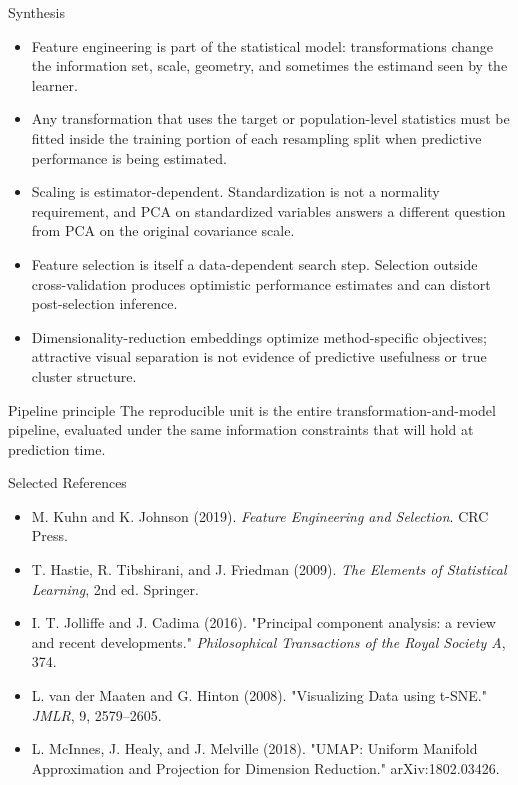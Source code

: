 \documentclass[aspectratio=169,11pt]{beamer}
\begin{document}
\begin{frame}{Synthesis}
  \begin{itemize}
    \item Feature engineering is part of the statistical model: transformations change the information set, scale, geometry, and sometimes the estimand seen by the learner.
    \item Any transformation that uses the target or population-level statistics must be fitted inside the training portion of each resampling split when predictive performance is being estimated.
    \item Scaling is estimator-dependent. Standardization is not a normality requirement, and PCA on standardized variables answers a different question from PCA on the original covariance scale.
    \item Feature selection is itself a data-dependent search step. Selection outside cross-validation produces optimistic performance estimates and can distort post-selection inference.
    \item Dimensionality-reduction embeddings optimize method-specific objectives; attractive visual separation is not evidence of predictive usefulness or true cluster structure.
  \end{itemize}

  \begin{alertbox}{Pipeline principle}
    The reproducible unit is the entire transformation-and-model pipeline, evaluated under the same information constraints that will hold at prediction time.
  \end{alertbox}
\end{frame}

\begin{frame}{Selected References}
  \small
  \begin{itemize}
    \item M. Kuhn and K. Johnson (2019). \textit{Feature Engineering and Selection}. CRC Press.
    \item T. Hastie, R. Tibshirani, and J. Friedman (2009). \textit{The Elements of Statistical Learning}, 2nd ed. Springer.
    \item I. T. Jolliffe and J. Cadima (2016). "Principal component analysis: a review and recent developments." \textit{Philosophical Transactions of the Royal Society A}, 374.
    \item L. van der Maaten and G. Hinton (2008). "Visualizing Data using t-SNE." \textit{JMLR}, 9, 2579--2605.
    \item L. McInnes, J. Healy, and J. Melville (2018). "UMAP: Uniform Manifold Approximation and Projection for Dimension Reduction." arXiv:1802.03426.
  \end{itemize}
\end{frame}

\contactslide
\end{document}
